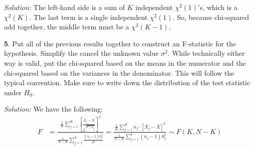 \documentclass{tufte-handout}
\begin{document}
\textit{Solution:} The left-hand side is a sum of $K$ independent $\chi^2(1)$'s, which is a
$\chi^2(K)$. The last term is a single independent $\chi^2(1)$. So, because
chi-squared add together, the middle term must be a $\chi^2(K - 1)$.

\textbf{5}. Put all of the previous results together to construct an F-statistic for the
hypothesis. Simplify the cancel the unknown value $\sigma^2$. While technically
either way is valid, put the chi-squared based on the means in the numerator and
the chi-squared based on the variances in the denominator. This will follow the
typical convention. Make sure to write down the distribution of the test statistic
under $H_0$.

\textit{Solution:} We have the following:
\begin{align*}
F &= \frac{
  \frac{1}{K} \sum_{j=1}^K \left[\frac{\bar{X}_j - \bar{X}}{\sqrt{\sigma^2 / n_j}}\right]^2
}{
  \frac{1}{N-K} \sum_{j=1}^k \frac{(n_j - 1) S_1^j}{\sigma^2}
} = \frac{
  \frac{1}{K} \sum_{j=1}^K n_j \cdot \left[\bar{X}_j - \bar{X}\right]^2
}{
  \frac{1}{N-K} \sum_{j=1}^k (n_j - 1) S_1^j
} \sim F(K, N-K)
\end{align*}
\end{document}
